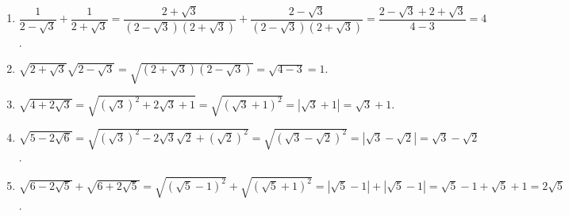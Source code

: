 \begin{bt}
{\begin{enumerate}
			\item $ \dfrac{1}{2 - \sqrt{3}} + \dfrac{1}{2 + \sqrt{3}} = \dfrac{2 + \sqrt{3}}{\left(2 - \sqrt{3}\right)\left(2 + \sqrt{3}\right)} + \dfrac{2 - \sqrt{3}}{\left(2 - \sqrt{3}\right)\left(2 + \sqrt{3}\right)} = \dfrac{2 - \sqrt{3} + 2 + \sqrt{3}}{4 - 3} = 4 $.
			\item $ \sqrt{2 + \sqrt{3}}\sqrt{2 - \sqrt{3}} = \sqrt{\left(2 + \sqrt{3}\right)\left(2 - \sqrt{3}\right)} = \sqrt{4 - 3} = 1$.
			\item $ \sqrt{4+2\sqrt{3}} = \sqrt{\left(\sqrt{3}\right)^2 + 2\sqrt{3} + 1} = \sqrt{\left(\sqrt{3} + 1 \right)^2} = \left| \sqrt{3} + 1 \right| = \sqrt{3} + 1 $.
			\item $ \sqrt{5 - 2\sqrt{6}} = \sqrt{\left(\sqrt{3}\right)^2 - 2\sqrt{3}\sqrt{2} + \left(\sqrt{2}\right)^2} = \sqrt{\left(\sqrt{3} - \sqrt{2} \right)^2} = \left| \sqrt{3} - \sqrt{2} \right| = \sqrt{3} - \sqrt{2} $.
			\item $ \sqrt{6 - 2\sqrt{5}} + \sqrt{6 + 2\sqrt{5}} = \sqrt{\left(\sqrt{5} - 1 \right)^2} + \sqrt{\left(\sqrt{5} + 1 \right)^2} = \left| \sqrt{5} - 1 \right| + \left| \sqrt{5} - 1 \right| = \sqrt{5} - 1 + \sqrt{5} + 1 = 2\sqrt{5} $.
		\end{enumerate}
	}
\end{bt}

